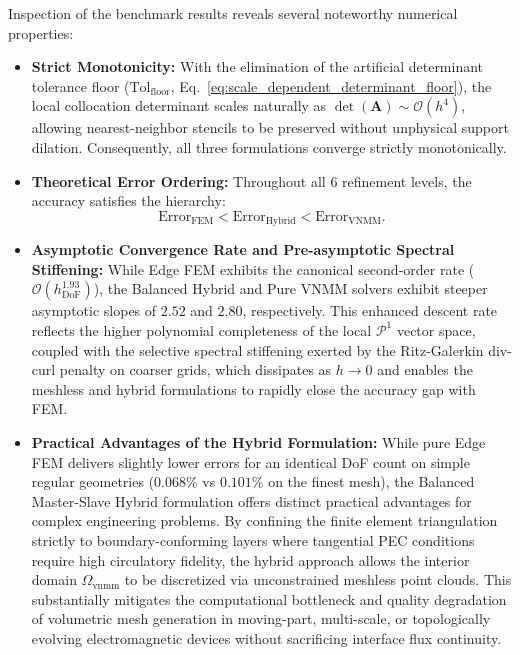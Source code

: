 \documentclass[preprint,12pt]{elsarticle}
\begin{document}
Inspection of the benchmark results reveals several noteworthy numerical properties:
\begin{itemize}
    \item \textbf{Strict Monotonicity:} With the elimination of the artificial determinant tolerance floor ($\mathrm{Tol}_{\mathrm{floor}}$, Eq.~\eqref{eq:scale_dependent_determinant_floor}), the local collocation determinant scales naturally as $\det(\mathbf{A}) \sim \mathcal{O}(h^4)$, allowing nearest-neighbor stencils to be preserved without unphysical support dilation. Consequently, all three formulations converge strictly monotonically.
    \item \textbf{Theoretical Error Ordering:} Throughout all 6 refinement levels, the accuracy satisfies the hierarchy:
    \begin{equation}
        \mathrm{Error}_{\mathrm{FEM}} < \mathrm{Error}_{\mathrm{Hybrid}} < \mathrm{Error}_{\mathrm{VNMM}}.
    \end{equation}
    \item \textbf{Asymptotic Convergence Rate and Pre-asymptotic Spectral Stiffening:} While Edge FEM exhibits the canonical second-order rate ($\mathcal{O}(h_{\mathrm{DoF}}^{1.93})$), the Balanced Hybrid and Pure VNMM solvers exhibit steeper asymptotic slopes of $2.52$ and $2.80$, respectively. This enhanced descent rate reflects the higher polynomial completeness of the local $\mathcal{P}^1$ vector space, coupled with the selective spectral stiffening exerted by the Ritz-Galerkin div-curl penalty on coarser grids, which dissipates as $h \to 0$ and enables the meshless and hybrid formulations to rapidly close the accuracy gap with FEM.
    \item \textbf{Practical Advantages of the Hybrid Formulation:} While pure Edge FEM delivers slightly lower errors for an identical DoF count on simple regular geometries ($0.068\%$ vs $0.101\%$ on the finest mesh), the Balanced Master-Slave Hybrid formulation offers distinct practical advantages for complex engineering problems. By confining the finite element triangulation strictly to boundary-conforming layers where tangential PEC conditions require high circulatory fidelity, the hybrid approach allows the interior domain $\Omega_{\mathrm{vnmm}}$ to be discretized via unconstrained meshless point clouds. This substantially mitigates the computational bottleneck and quality degradation of volumetric mesh generation in moving-part, multi-scale, or topologically evolving electromagnetic devices without sacrificing interface flux continuity.
\end{itemize}
\end{document}
